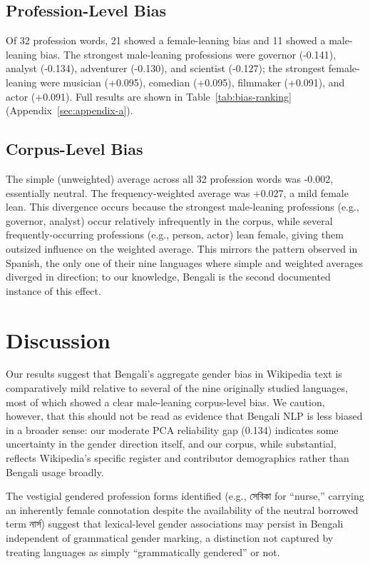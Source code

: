 \documentclass[11pt]{article}
\newcommand{\bn}[1]{{\bengalifont #1}}
\begin{document}
\subsection{Profession-Level Bias}

Of 32 profession words, 21 showed a female-leaning bias and 11 showed a male-leaning bias. The strongest male-leaning professions were governor (-0.141), analyst (-0.134), adventurer (-0.130), and scientist (-0.127); the strongest female-leaning were musician (+0.095), comedian (+0.095), filmmaker (+0.091), and actor (+0.091). Full results are shown in Table~\ref{tab:bias-ranking} (Appendix~\ref{sec:appendix-a}).

\subsection{Corpus-Level Bias}

The simple (unweighted) average across all 32 profession words was -0.002, essentially neutral. The frequency-weighted average was +0.027, a mild female lean. This divergence occurs because the strongest male-leaning professions (e.g., governor, analyst) occur relatively infrequently in the corpus, while several frequently-occurring professions (e.g., person, actor) lean female, giving them outsized influence on the weighted average. This mirrors the pattern \citet{chen2021gender} observed in Spanish, the only one of their nine languages where simple and weighted averages diverged in direction; to our knowledge, Bengali is the second documented instance of this effect.

\section{Discussion}

Our results suggest that Bengali's aggregate gender bias in Wikipedia text is comparatively mild relative to several of the nine originally studied languages, most of which showed a clear male-leaning corpus-level bias. We caution, however, that this should not be read as evidence that Bengali NLP is less biased in a broader sense: our moderate PCA reliability gap (0.134) indicates some uncertainty in the gender direction itself, and our corpus, while substantial, reflects Wikipedia's specific register and contributor demographics rather than Bengali usage broadly.

The vestigial gendered profession forms identified (e.g., \bn{সেবিকা} for ``nurse,'' carrying an inherently female connotation despite the availability of the neutral borrowed term \bn{নার্স}) suggest that lexical-level gender associations may persist in Bengali independent of grammatical gender marking, a distinction not captured by treating languages as simply ``grammatically gendered'' or not.
\end{document}
